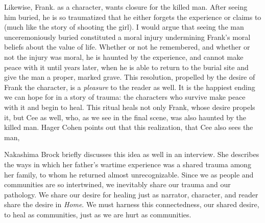 \documentclass[12pt]{article}
\begin{document}
Likewise, Frank. as a character, wants closure for the killed man. After seeing
him buried, he is so traumatized that he either forgets the experience or
claims to (much like the story of shooting the girl).\autocite[p. 5-6]{home} I
would argue that seeing the man unceremoniously buried constituted a moral
injury undermining Frank's moral beliefs about the value of life. Whether or
not he remembered, and whether or not the injury was moral, he is haunted by
the experience, and cannot make peace with it until years later, when he is
able to return to the burial site and give the man a proper, marked grave. This
resolution, propelled by the desire of Frank the character, is a
\emph{pleasure} to the reader as well. It is the happiest ending we can hope
for in a story of trauma: the characters who survive make peace with it and
begin to heal. This ritual heals not only Frank, whose desire propels it, but
Cee as well, who, as we see in the final scene, was also haunted by the killed
man. Hager Cohen points out that this realization, that Cee also sees the man,
\autocite{point-of-return}

Nakashima Brock briefly discusses this idea as well in an interview. She
describes the ways in which her father's wartime experience was a shared trauma
among her family, to whom he returned almost
unrecognizable.\autocite{moral-injury} Since we as people and communities are
so intertwined, we inevitably share our trauma and our pathology. We share our
desire for healing just as narrator, character, and reader share the desire in
\emph{Home}. We must harness this connectedness, our shared desire, to heal as
communities, just as we are hurt as communities.

\end{document}

